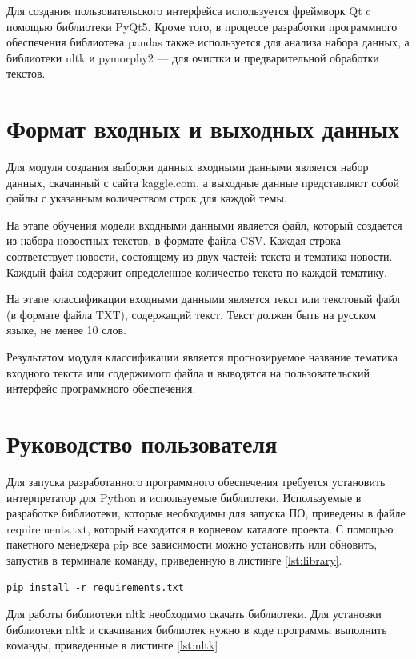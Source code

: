 Для создания пользовательского интерфейса используется фреймворк Qt c помощью библиотеки PyQt5. Кроме того, в процессе разработки программного обеспечения библиотека pandas также используется для анализа набора данных, а библиотеки nltk и pymorphy2 — для очистки и предварительной обработки текстов.

\section{Формат входных и выходных данных}
Для модуля создания выборки данных входными данными является набор данных, скачанный с сайта kaggle.com, а выходные данные представляют собой файлы с указанным количеством строк для каждой темы.

На этапе обучения модели входными данными является файл, который создается из набора новостных текстов, в формате файла CSV. Каждая строка соответствует новости, состоящему из двух частей: текста и тематика новости. Каждый файл содержит определенное количество текста по каждой тематику.

На этапе классификации входными данными является текст или текстовый файл (в формате файла TXT), содержащий текст. Текст должен быть на русском языке, не менее 10 слов.

Результатом модуля классификации является прогнозируемое название тематика входного текста или содержимого файла и выводятся на пользовательский интерфейс программного обеспечения.

\section{Руководство пользователя}

Для запуска разработанного программного обеспечения требуется установить интерпретатор для Python и используемые библиотеки. Используемые в разработке библиотеки, которые необходимы для запуска ПО, приведены в файле requirements.txt, который находится в корневом каталоге проекта. С помощью пакетного менеджера pip все зависимости можно установить или обновить, запустив в терминале команду, приведенную в листинге \ref{lst:library}.

\begin{lstlisting}[caption=Установка всех необходимых библиотек,label=lst:library]
pip install -r requirements.txt
\end{lstlisting}

Для работы библиотеки nltk необходимо скачать библиотеки. Для установки библиотеки nltk и скачивания библиотек нужно в коде программы выполнить команды, приведенные в листинге \ref{lst:nltk}

